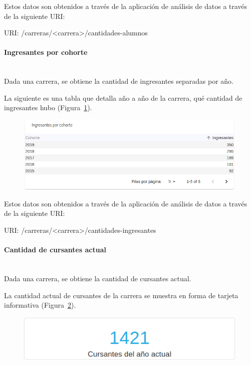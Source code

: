 Estos datos son obtenidos a través de la aplicación de análisis de datos a través de la siguiente URI:

URI: /carreras/<carrera>/cantidades-alumnos \\


\paragraph{Ingresantes por cohorte}\mbox{}\\


Dada una carrera, se obtiene la cantidad de ingresantes separadas por año.

La siguiente es una tabla que detalla año a año de la carrera, qué cantidad de ingresantes hubo  (Figura~\ref{fig:sa-ingresantes-cohorte}).

\begin{figure}[H]
  \centering
    \includegraphics[scale=0.4]{images/seguimiento-academico/sa-ingresantes-cohorte.png}
  \label{fig:sa-ingresantes-cohorte}
\end{figure}

Estos datos son obtenidos a través de la aplicación de análisis de datos a través de la siguiente URI:

URI: /carreras/<carrera>/cantidades-ingresantes \\


\paragraph{Cantidad de cursantes actual}\mbox{}\\

Dada una carrera, se obtiene la cantidad de cursantes actual.

La cantidad actual de cursantes de la carrera se muestra en forma de tarjeta informativa (Figura~\ref{fig:sa-cursantes}). 

\begin{figure}[H]
  \centering
    \includegraphics[scale=0.4]{images/seguimiento-academico/sa-cursantes.png}
  \label{fig:sa-cursantes}
\end{figure}

